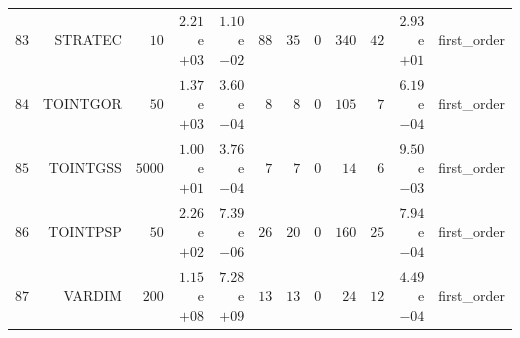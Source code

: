 \begin{longtable}{rrrrrrrrrrrr}
  \(    83\) & STRATEC & \(    10\) & \( 2.21\)e\(+03\) & \( 1.10\)e\(-02\) & \(    88\) & \(    35\) & \(     0\) & \(   340\) & \(    42\) & \( 2.93\)e\(+01\) & first\_order \\
  \(    84\) & TOINTGOR & \(    50\) & \( 1.37\)e\(+03\) & \( 3.60\)e\(-04\) & \(     8\) & \(     8\) & \(     0\) & \(   105\) & \(     7\) & \( 6.19\)e\(-04\) & first\_order \\
  \(    85\) & TOINTGSS & \(  5000\) & \( 1.00\)e\(+01\) & \( 3.76\)e\(-04\) & \(     7\) & \(     7\) & \(     0\) & \(    14\) & \(     6\) & \( 9.50\)e\(-03\) & first\_order \\
  \(    86\) & TOINTPSP & \(    50\) & \( 2.26\)e\(+02\) & \( 7.39\)e\(-06\) & \(    26\) & \(    20\) & \(     0\) & \(   160\) & \(    25\) & \( 7.94\)e\(-04\) & first\_order \\
  \(    87\) & VARDIM & \(   200\) & \( 1.15\)e\(+08\) & \( 7.28\)e\(+09\) & \(    13\) & \(    13\) & \(     0\) & \(    24\) & \(    12\) & \( 4.49\)e\(-04\) & first\_order \\\hline
\end{longtable}
